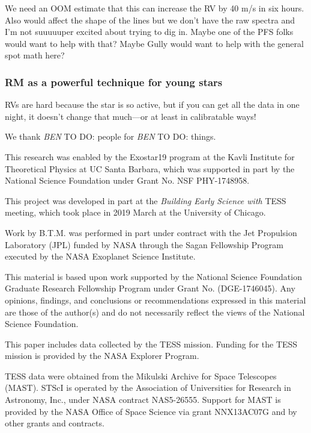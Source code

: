 \documentclass[twocolumn]{aastex62}
\newcommand{\todo}[3]{{\color{#2} \emph{#1} TO DO: #3}}
\newcommand{\btmtodo}[1]{\todo{BEN}{blue}{#1}}
\begin{document}
We need an OOM estimate that this can increase the RV by 40 m/s in six hours.
Also would affect the shape of the lines but we don't have the raw spectra and I'm not suuuuuper excited about trying to dig in. Maybe one of the PFS folks would want to help with that? 
Maybe Gully would want to help with the general spot math here?

\subsubsection{RM as a powerful technique for young stars}

RVs are hard because the star is so active, but if you can get all the data in one night, it doesn't change that much---or at least in calibratable ways!




\acknowledgements

We thank \btmtodo{people} for \btmtodo{things}.


This research was enabled by the Exostar19 program at the Kavli Institute for Theoretical Physics at UC Santa Barbara, which was supported in part by the National Science Foundation under Grant No. NSF PHY-1748958.

This project was developed in part at the \textit{Building Early Science with} TESS meeting, which took place in 2019 March at the University of Chicago.

Work by B.T.M. was performed in part under contract with the Jet
Propulsion Laboratory (JPL) funded by NASA through
the Sagan Fellowship Program executed by the NASA
Exoplanet Science Institute.

This material is based upon work supported by the National Science Foundation Graduate Research Fellowship Program under Grant No. (DGE-1746045). Any opinions, findings, and conclusions or recommendations expressed in this material are those of the author(s) and do not necessarily reflect the views of the National Science Foundation.



This paper includes data collected by the TESS mission. Funding for the TESS mission is provided by the NASA Explorer Program.

TESS data were obtained from the Mikulski Archive for Space Telescopes
(MAST).
STScI is operated by the Association of Universities for Research in
Astronomy, Inc., under NASA contract NAS5-26555.
Support for MAST is provided by the NASA Office of Space Science via grant
NNX13AC07G and by other grants and contracts.










\end{document}
